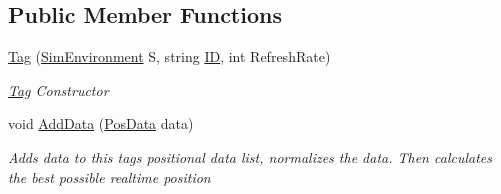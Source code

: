 \subsection*{Public Member Functions}
\begin{DoxyCompactItemize}
\item 
\hyperlink{class_pozyx_positioner_1_1_framework_1_1_tag_a6d2e7bd4c11d5f5f32cc57c38b343542}{Tag} (\hyperlink{class_pozyx_positioner_1_1_framework_1_1_sim_environment}{Sim\+Environment} S, string \hyperlink{class_pozyx_positioner_1_1_framework_1_1_tag_a0d75eeca4dea7088e2b4a60230c13012}{ID}, int Refresh\+Rate)
\begin{DoxyCompactList}\small\item\em \hyperlink{class_pozyx_positioner_1_1_framework_1_1_tag}{Tag} Constructor \end{DoxyCompactList}\item 
void \hyperlink{class_pozyx_positioner_1_1_framework_1_1_tag_ac2741e137c420ad71f64ee2d3d5fefe8}{Add\+Data} (\hyperlink{struct_pozyx_positioner_1_1_framework_1_1_pos_data}{Pos\+Data} data)
\begin{DoxyCompactList}\small\item\em Adds data to this tag\textquotesingle{}s positional data list, normalizes the data. Then calculates the best possible realtime position \end{DoxyCompactList}\end{DoxyCompactItemize}
